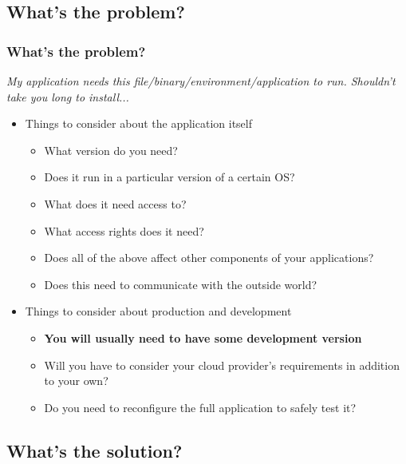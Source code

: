 \documentclass{beamer}
\begin{document}
\subsection{What's the problem?} 
\begin{frame}
    \frametitle{What's the problem?}
    \textit{My application needs this file/binary/environment/application to run. Shouldn't take you long to install...}
    \begin{itemize}
        \item Things to consider about the application itself
        \begin{itemize}
            \item What version do you need?
            \item Does it run in a particular version of a certain OS?
            \item What does it need access to?
            \item What access rights does it need?
            \item Does all of the above affect other components of your applications?
            \item Does this need to communicate with the outside world?
        \end{itemize}
    \end{itemize}
    \begin{itemize}
        \item Things to consider about production and development
        \begin{itemize}
            \item \textbf{You will usually need to have some development version}
            \item Will you have to consider your cloud provider's requirements in addition to your own?
            \item Do you need to reconfigure the full application to safely test it?
        \end{itemize}
    \end{itemize}
\end{frame}

\subsection{What's the solution?} 
\end{document}
